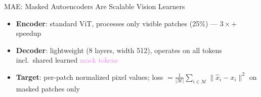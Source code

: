 \begin{frame}[fragile]{MAE: Masked Autoencoders Are Scalable Vision Learners}
  \vspace{0.2em}
  \begin{itemize}
    \item \textbf{Encoder}: standard ViT, processes only \textcolor{green!50!black}{visible patches} (25\%) --- $3\times$+ speedup
    \item \textbf{Decoder}: lightweight (8 layers, width 512), operates on all tokens incl.\ shared learned \textcolor{violet}{mask tokens}
    \item \textbf{Target}: per-patch normalized pixel values; loss $= \frac{1}{|\mathcal{M}|}\sum_{i \in \mathcal{M}} \|\hat{x}_i - x_i\|^2$ on masked patches only
  \end{itemize}
\end{frame}


